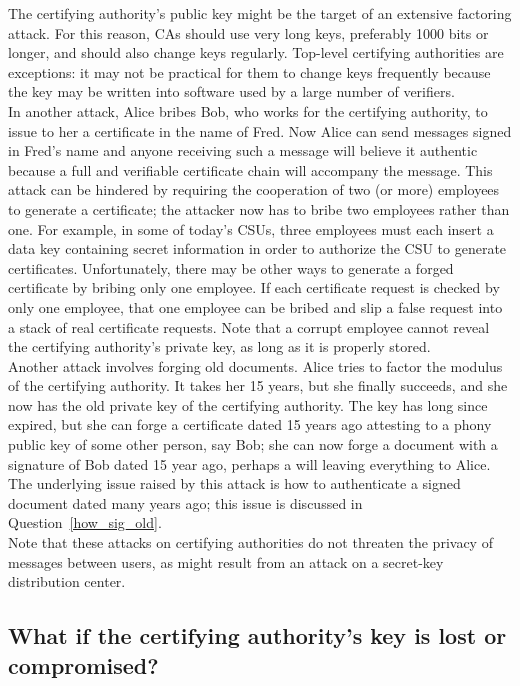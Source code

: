 The certifying authority's public key might be the target of an
extensive factoring attack. For this reason, CAs should use very long
keys, preferably 1000 bits or longer, and should also change keys
regularly. Top-level certifying authorities are exceptions: it may not
be practical for them to change keys frequently because the key may be
written into software used by a large number of verifiers.\\

In another attack, Alice bribes Bob, who works for the certifying
authority, to issue to her a certificate in the name of Fred. Now Alice
can send messages signed in Fred's name and anyone receiving such a
message will believe it authentic because a full and verifiable
certificate chain will accompany the message. This attack can be
hindered by requiring the cooperation of two (or more) employees to
generate a certificate; the attacker now has to bribe two employees
rather than one. For example, in some of today's CSUs, three employees
must each insert a data key containing secret information in order to
authorize the CSU to generate certificates. Unfortunately, there may be
other ways to generate a forged certificate by bribing only one
employee. If each certificate request is checked by only one employee,
that one employee can be bribed and slip a false request into a stack
of real certificate requests. Note that a corrupt employee cannot
reveal the certifying authority's private key, as long as it is
properly stored.\\

Another attack involves forging old documents. Alice tries to factor the
modulus of the certifying authority. It takes her 15 years, but she finally
succeeds, and she now has the old private key of the certifying authority.
The key has long since expired, but she can forge a certificate dated 15
years ago attesting to a phony public key of some other person, say Bob;
she can now forge a document with a signature of Bob dated 15 year ago,
perhaps a will leaving everything to Alice. The underlying issue raised by
this attack is how to authenticate a signed document dated many years ago;
this issue is discussed in Question~\ref{how_sig_old}.\\

Note that these attacks on certifying authorities do not threaten the
privacy of messages between users, as might result from an attack on a
secret-key distribution center.

\subsection{What if the certifying authority's key is lost or compromised?}
\label{what_key_lost}

